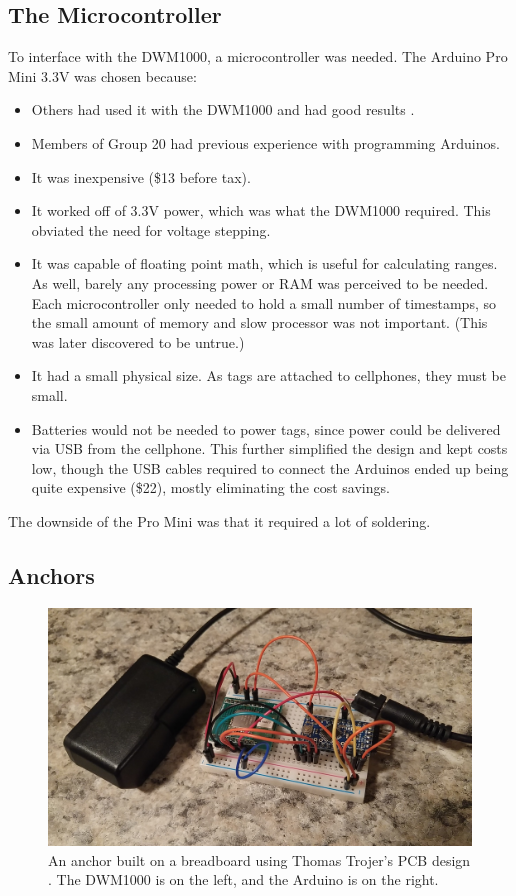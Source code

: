 \subsection{The Microcontroller}
To interface with the DWM1000, a microcontroller was needed. The Arduino Pro Mini 3.3V was chosen because:
\begin{itemize}
	\item Others had used it with the DWM1000 and had good results \cite{LPSMini}.
	\item Members of Group 20 had previous experience with programming Arduinos.
	\item It was inexpensive (\$13 before tax).
	\item It worked off of 3.3V power, which was what the DWM1000 required. This obviated the need for voltage stepping.
	\item It was capable of floating point math, which is useful for calculating ranges. As well, barely any processing power or RAM was perceived to be needed. Each microcontroller only needed to hold a small number of timestamps, so the small amount of memory and slow processor was not important. (This was later discovered to be untrue.)
	\item It had a small physical size. As tags are attached to cellphones, they must be small.
	\item Batteries would not be needed to power tags, since power could be delivered via USB from the cellphone. This further simplified the design and kept costs low, though the USB cables required to connect the Arduinos ended up being quite expensive (\$22), mostly eliminating the cost savings.
\end{itemize}

The downside of the Pro Mini was that it required a lot of soldering. 

\subsection{Anchors}
\begin{figure}
	\centering
	\includegraphics[width=\linewidth]{Figures/Anchor.jpg}
	\decoRule
	\caption{An anchor built on a breadboard using Thomas Trojer's PCB design \cite{ThotroGithub}. The DWM1000 is on the left, and the Arduino is on the right.}
	\label{fig:Anchor}
\end{figure}

